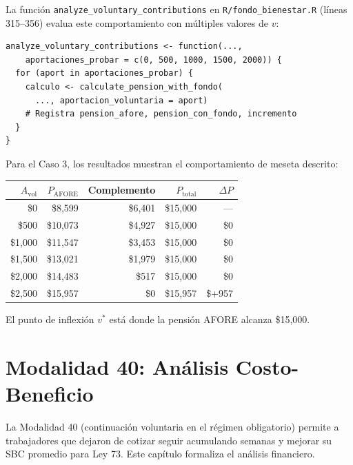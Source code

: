 \documentclass[11pt,a4paper]{report}
\theoremstyle{remark}
\begin{document}
\begin{tcolorbox}[colback=orange!5!white, colframe=orange!75!black, title=\textbf{Aplicaci\'on en C\'odigo}]
La funci\'on \texttt{analyze\_voluntary\_contributions} en \texttt{R/fondo\_bienestar.R} (l\'ineas 315--356) evalua este comportamiento con m\'ultiples valores de $v$:
\begin{lstlisting}
analyze_voluntary_contributions <- function(...,
    aportaciones_probar = c(0, 500, 1000, 1500, 2000)) {
  for (aport in aportaciones_probar) {
    calculo <- calculate_pension_with_fondo(
      ..., aportacion_voluntaria = aport)
    # Registra pension_afore, pension_con_fondo, incremento
  }
}
\end{lstlisting}

Para el Caso 3, los resultados muestran el comportamiento de meseta descrito:

\begin{center}
\small
\begin{tabular}{rrrrr}
\toprule
$A_{\text{vol}}$ & $P_{\text{AFORE}}$ & Complemento & $P_{\text{total}}$ & $\Delta P$ \\
\midrule
\$0 & \$8,599 & \$6,401 & \$15,000 & --- \\
\$500 & \$10,073 & \$4,927 & \$15,000 & \$0 \\
\$1,000 & \$11,547 & \$3,453 & \$15,000 & \$0 \\
\$1,500 & \$13,021 & \$1,979 & \$15,000 & \$0 \\
\$2,000 & \$14,483 & \$517 & \$15,000 & \$0 \\
\$2,500 & \$15,957 & \$0 & \$15,957 & \$+957 \\
\bottomrule
\end{tabular}
\end{center}

El punto de inflexi\'on $v^*$ est\'a donde la pensi\'on AFORE alcanza \$15,000.
\end{tcolorbox}

\chapter{Modalidad 40: An\'alisis Costo-Beneficio}

La Modalidad 40 (continuaci\'on voluntaria en el r\'egimen obligatorio) permite a trabajadores que dejaron de cotizar seguir acumulando semanas y mejorar su SBC promedio para Ley 73. Este cap\'itulo formaliza el an\'alisis financiero.
\end{document}
